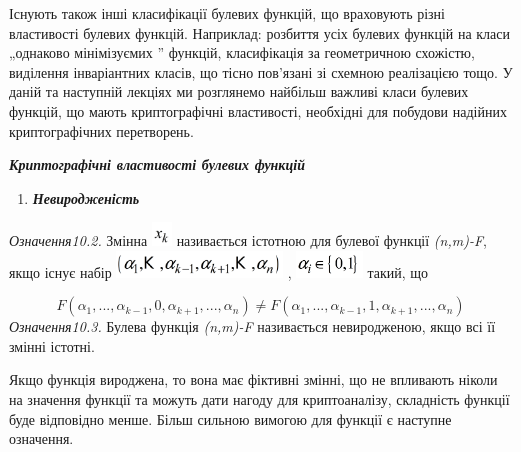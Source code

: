 \documentclass[a4paper]{article}
\newcommand\liststyleWWviiiNumxxix{%
\renewcommand\theenumi{\arabic{enumi}}
\renewcommand\theenumii{\arabic{enumii}}
\renewcommand\theenumiii{\roman{enumiii}}
\renewcommand\theenumiv{\arabic{enumiv}}
\renewcommand\labelenumi{\theenumi.}
\renewcommand\labelenumii{\theenumii.}
\renewcommand\labelenumiii{\theenumiii.}
\renewcommand\labelenumiv{\theenumiv.}
}
\newcounter{}
\begin{document}
Існують також інші класифікації булевих функцій, що враховують різні властивості
булевих функцій. Наприклад: розбиття усіх булевих функцій на класи „однаково
мінімізуємих ” функцій, класифікація за геометричною схожістю, виділення
інваріантних класів, що тісно пов’язані зі схемною реалізацією тощо. У даній та
наступній лекціях ми розглянемо найбільш важливі класи булевих функцій, що
мають криптографічні властивості, необхідні для побудови надійних
криптографічних перетворень.


\bigskip

{\centering\bfseries\itshape
Криптографічні властивості булевих функцій
\par}


\bigskip


\bigskip

\liststyleWWviiiNumxxix
\begin{enumerate}
\item {\bfseries\itshape
Невиродженість}
\end{enumerate}
 \textit{Означення10.2.}\textit{ }Змінна  
\includegraphics[width=0.2083in,height=0.25in]{crypt-img/crypt-img193.png} 
називається  істотною для булевої функції 
\textit{(}\textit{n}\textit{,}\textit{m}\textit{)-}\textit{F}, якщо існує набір
 \includegraphics[width=1.7362in,height=0.278in]{crypt-img/crypt-img194.png} , 
\includegraphics[width=0.6937in,height=0.278in]{crypt-img/crypt-img195.png} 
такий, що 

\begin{equation*}
{F(\alpha _{{1}},\text{.}\text{.}\text{.},\alpha _{{k-1}},0,\alpha
_{{k+1}},\text{.}\text{.}\text{.},\alpha _{{n}})\neq F(\alpha
_{{1}},\text{.}\text{.}\text{.},\alpha _{{k-1}},1,\alpha
_{{k+1}},\text{.}\text{.}\text{.},\alpha _{{n}})}
\end{equation*}
 \textit{Означення10.3.}\textit{ }Булева функція
\textit{(}\textit{n}\textit{,}\textit{m}\textit{)-}\textit{F}  називається
невиродженою, якщо всі її змінні істотні.

Якщо функція вироджена, то вона має фіктивні змінні, що не впливають ніколи на
значення функції та можуть дати нагоду для криптоаналізу, складність функції
буде відповідно менше. Більш сильною вимогою для функції є наступне означення.
\end{document}
